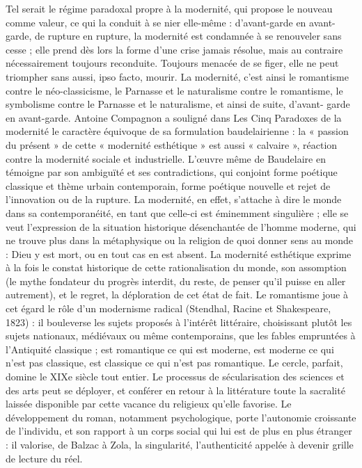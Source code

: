 Tel serait le régime paradoxal propre à la modernité, qui propose le nouveau comme valeur, ce qui la conduit à se nier elle-même : d'avant-garde en avant-garde, de rupture en rupture, la modernité est condamnée à se renouveler sans cesse ; elle prend dès lors la forme d'une crise jamais résolue, mais au contraire nécessairement toujours reconduite. Toujours menacée de se figer, elle ne peut triompher sans aussi, ipso facto, mourir. La modernité, c'est ainsi le romantisme contre le néo-classicisme, le Parnasse et le naturalisme contre le romantisme, le symbolisme contre le Parnasse et le naturalisme, et ainsi de suite, d'avant- garde en avant-garde. Antoine Compagnon a souligné dans Les Cinq Paradoxes de la modernité le caractère équivoque de sa formulation baudelairienne : la « passion du présent » de cette
« modernité esthétique » est aussi « calvaire », réaction contre la modernité sociale et industrielle. L'œuvre même de Baudelaire en témoigne par son ambiguïté et ses contradictions, qui conjoint forme poétique classique et thème urbain contemporain, forme poétique nouvelle et rejet de l'innovation ou de la rupture.
La modernité, en effet, s'attache à dire le monde dans sa contemporanéité, en tant que celle-ci est éminemment singulière ; elle se veut l'expression de la situation historique désenchantée de l'homme moderne, qui ne trouve plus dans la métaphysique ou la religion de quoi donner sens au monde : Dieu y est mort, ou en tout cas en est absent. La modernité esthétique exprime à la fois le constat historique de cette rationalisation du monde, son assomption (le mythe fondateur du progrès interdit, du reste, de penser qu'il puisse en aller autrement), et le regret, la déploration de cet état de fait.
Le romantisme joue à cet égard le rôle d'un modernisme radical (Stendhal, Racine et Shakespeare, 1823) : il bouleverse les sujets proposés à l'intérêt littéraire, choisissant plutôt les sujets nationaux, médiévaux ou même contemporains, que les fables empruntées à l'Antiquité classique ; est romantique ce qui est moderne, est moderne ce qui n'est pas classique, est classique ce qui n'est pas romantique. Le cercle, parfait, domine le XIXe siècle tout entier. Le processus de sécularisation des sciences et des arts peut se déployer, et conférer en retour à la littérature toute la sacralité laissée disponible par cette vacance du religieux qu'elle favorise. Le développement du roman, notamment psychologique, porte l'autonomie croissante de l'individu, et son rapport à un corps social qui lui est de plus en plus étranger : il valorise, de Balzac à Zola, la singularité, l'authenticité appelée à devenir grille de lecture du réel.
